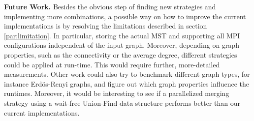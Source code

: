 \documentclass[letterpaper]{article}
\newcommand{\mypar}[1]{{\bf #1.}}
\begin{document}
\mypar{Future Work}
Besides the obvious step of finding new strategies and implementing more combinations, a possible way on how to improve
the current implementations is by resolving the limitations described in section \ref{par:limitation}. In particular,
storing the actual MST and supporting all MPI configurations independent of the input graph. Moreover, depending on
graph properties, such as the connectivity or the average degree, different strategies could be applied at run-time.
This would require further, more-detailed measurements. Other work could also try to benchmark different graph types,
for instance Erdös-Renyi graphs, and figure out which graph properties influence the runtimes. Moreover, it would be
interesting to see if a parallelized merging strategy using a wait-free Union-Find data structure \cite{wfuf} performs
better than our current implementations.
\end{document}
